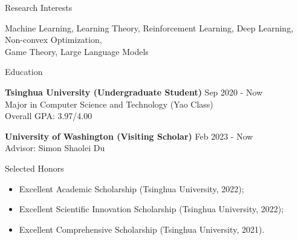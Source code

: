 \documentclass{resume} %
\begin{document}

\begin{rSection}{Research Interests}

{Machine Learning, Learning Theory, Reinforcement Learning, Deep Learning, Non-convex Optimization, \\
Game Theory, Large Language Models}


\end{rSection}

\begin{rSection}{Education}

{\bf Tsinghua University (Undergraduate Student)}  \hfill {Sep 2020 - Now}\\
Major in Computer Science and Technology (Yao Class) \\
Overall GPA: 3.97/4.00

{\bf University of Washington (Visiting Scholar)} \hfill {Feb 2023 - Now} \\
Advisor: Simon Shaolei Du


\end{rSection}

\begin{rSection}{Selected Honors}


\begin{itemize}
    \item Excellent Academic Scholarship (Tsinghua University, 2022);
    \item Excellent Scientific Innovation Scholarship (Tsinghua University, 2022);
    \item Excellent Comprehensive Scholarship (Tsinghua University, 2021).
\end{itemize}
\end{rSection}
\end{document}
